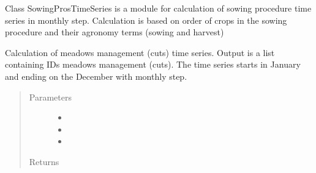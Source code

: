 \documentclass[letterpaper,10pt,english]{sphinxmanual}
\begin{document}
\label{\detokenize{libs:module-sowing_proc}}

\begin{fulllineitems}
\label{\detokenize{libs:sowing_proc.SowingProcTimeSeries}}
Class SowingProsTimeSeries is a module for calculation of
sowing procedure time series in monthly step. Calculation is
based on order of crops in the sowing procedure and their
agronomy terms (sowing and harvest)

\begin{fulllineitems}
\label{\detokenize{libs:sowing_proc.SowingProcTimeSeries.calcMeadows}}
Calculation of meadows management (cuts) time series. Output is a
list containing IDs meadows management (cuts).
The time series starts in January and ending on the December with
monthly step.
\begin{quote}\begin{description}
\item[{Parameters}] \leavevmode\begin{itemize}
\item {} 
 \textendash{} 

\item {} 
 \textendash{} 

\item {} 
 \textendash{} 

\end{itemize}

\item[{Returns}] \leavevmode


\end{description}\end{quote}


\end{fulllineitems}
\end{fulllineitems}
\end{document}
